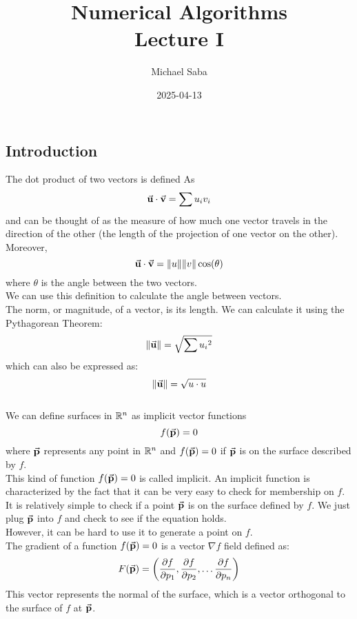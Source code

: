 \documentclass[12pt]{article}
\title{%
    \Huge Numerical Algorithms \\
    \Large Lecture I
}
\date{2025-04-13}
\author{Michael Saba}
\begin{document}
\maketitle
\newpage
\setlength{\parindent}{0pt}

    \subsection*{Introduction}

    The dot product of two vectors is defined As
    \[ \vec{\mathbf{u}} \cdot \vec{\mathbf{v}} = \sum u_iv_i \]
    and can be thought of as the measure of how much
    one vector travels in the direction of the other
    (the length of the projection of one vector
    on the other). \\

    Moreover, 
    \[ \vec{\mathbf{u}} \cdot \vec{\mathbf{v}} = \|u\|\|v\|\cos(\theta) \]
    where $\theta$ is the angle between the two vectors. \\
    We can use this definition to calculate the
    angle between vectors. \\

    The norm, or magnitude, of a vector,
    is its length.
    We can calculate it using the Pythagorean Theorem:
    \[ \| \vec{\mathbf{u}} \| = \sqrt{\sum {u_i}^2 } \]
    which can also be expressed as: 
    \[ \| \vec{\mathbf{u}} \| = \sqrt{u \cdot u} \] \\

    We can define surfaces in $\mathbb{R}^n$ as 
    implicit vector functions
    \[ f(\vec{\mathbf{p}}) = 0 \]
    where $\vec{\mathbf{p}}$ represents any point in $\mathbb{R}^n$
    and $f(\vec{\mathbf{p}}) = 0$ if $\vec{\mathbf{p}}$ is on the surface
    described by $f$. \\  
    
    This kind of function $ f(\vec{\mathbf{p}}) = 0$
    is called implicit.
    An implicit function is characterized by the fact
    that it can be very easy to check for
    membership on $f$. \\
    It is relatively simple to check if a point 
    $\vec{\mathbf{p}}$ is on the surface defined by $f$.
    We just plug $\vec{\mathbf{p}}$ into $f$
    and check to see if the equation holds. \\
    However, it can be hard to use it to generate
    a point on $f$. \\

    The gradient of a function $f(\vec{\mathbf{p}}) = 0$
    is a vector $\nabla f$ field defined as:
    \[
        F(\vec{\mathbf{p}}) = \left(
            \dfrac{\partial f}{\partial p_1},
            \dfrac{\partial f}{\partial p_2},
            \dots
            \dfrac{\partial f}{\partial p_n}
        \right)
    \]
    This vector represents the normal of the surface,
    which is a vector orthogonal to the surface of $f$
    at $\vec{\mathbf{p}}$. \\
    
\end{document}

